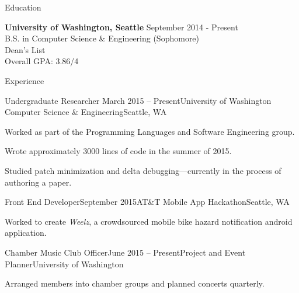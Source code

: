 \documentclass{resume} %
\begin{document}

\begin{rSection}{Education}

  {\bf University of Washington, Seattle} \hfill {September 2014 - Present} \\
  B.S. in Computer Science \& Engineering (Sophomore) \\
  Dean's List \\
  Overall GPA: 3.86/4

\end{rSection}


\begin{rSection}{Experience}

  \begin{rSubsection}{Undergraduate Researcher}
    {March 2015 -- Present}{University of Washington Computer Science \& Engineering}{Seattle, WA}
  \item Worked as part of the Programming Languages and Software Engineering
    group.
  \item Wrote approximately 3000 lines of code in the summer of 2015.
  \item Studied patch minimization and delta debugging---currently in the process of authoring a paper.
  \end{rSubsection}

  \begin{rSubsection}{Front End Developer}{September 2015}{AT\&T Mobile App Hackathon}{Seattle, WA}
  \item Worked to create \emph{Weelz}, a crowdsourced mobile bike hazard notification android application.
  \end{rSubsection}

  \begin{rSubsection}{Chamber Music Club Officer}{June 2015 -- Present}{Project and Event Planner}{University of Washington}
  \item Arranged members into chamber groups and planned concerts quarterly.
  \end{rSubsection}

\end{rSection}
\end{document}
